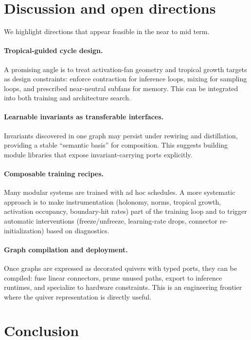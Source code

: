 \documentclass[11pt]{article}
\theoremstyle{definition}
\theoremstyle{plain}
\theoremstyle{remark}
\begin{document}
\section{Discussion and open directions}
\label{sec:discussion}

We highlight directions that appear feasible in the near to mid term.

\paragraph{Tropical-guided cycle design.}
A promising angle is to treat activation-fan geometry and tropical growth targets as design constraints: enforce contraction for inference loops, mixing for sampling loops, and prescribed near-neutral subfans for memory.
This can be integrated into both training and architecture search.

\paragraph{Learnable invariants as transferable interfaces.}
Invariants discovered in one graph may persist under rewiring and distillation, providing a stable ``semantic basis'' for composition.
This suggests building module libraries that expose invariant-carrying ports explicitly.

\paragraph{Composable training recipes.}
Many modular systems are trained with ad hoc schedules.
A more systematic approach is to make instrumentation (holonomy, norms, tropical growth, activation occupancy, boundary-hit rates) part of the training loop and to trigger automatic interventions (freeze/unfreeze, learning-rate drops, connector re-initialization) based on diagnostics.

\paragraph{Graph compilation and deployment.}
Once graphs are expressed as decorated quivers with typed ports, they can be compiled: fuse linear connectors, prune unused paths, export to inference runtimes, and specialize to hardware constraints.
This is an engineering frontier where the quiver representation is directly useful.

\section{Conclusion}
\label{sec:conclusion}
\end{document}

